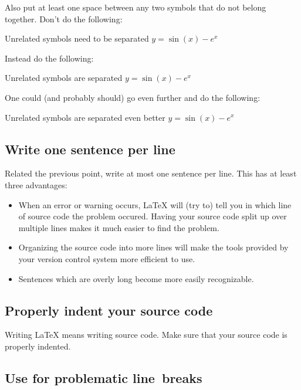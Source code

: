 Also put at least one space between any two symbols that do not belong together.
Don’t do the following:
\begin{showcode}{Unrelated symbols need to be separated}
$y=\sin(x)-e^x$
\end{showcode}
Instead do the following:
\begin{showcode}{Unrelated symbols are separated}
$y = \sin(x) - e^x$
\end{showcode}
One could (and probably should) go even further and do the following:
\begin{showcode}{Unrelated symbols are separated even better}
$y = \sin ( x ) - e^x$
\end{showcode}



\subsection{Write one sentence per line}

Related the previous point, write at most one sentence per line.
This has at least three advantages:
\begin{itemize}[wide=0pt, leftmargin=*]
  \item
    When an error or warning occurs, {\LaTeX} will (try to) tell you in which line of source code the problem occured.
    Having your source code split up over multiple lines makes it much easier to find the problem.
  \item
    Organizing the source code into more lines will make the tools provided by your version control system more efficient to use.
  \item
   Sentences which are overly long become more easily recognizable.
\end{itemize}



\subsection{Properly indent your source code}

Writing {\LaTeX} means writing source code.
Make sure that your source code is properly indented.



\subsection{Use \inlinecodetitle{\%} for problematic line~breaks}

